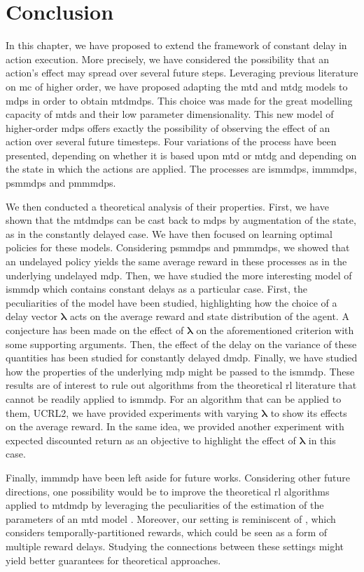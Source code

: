 \section{Conclusion}

In this chapter, we have proposed to extend the framework of constant delay in action execution.
More precisely, we have considered the possibility that an action's effect may spread over several future steps.
Leveraging previous literature on \gls{mc} of higher order, we have proposed adapting the \gls{mtd} and \gls{mtdg} models to \glspl{mdp} in order to obtain \glspl{mtdmdp}.
This choice was made for the great modelling capacity of \glspl{mtd} and their low parameter dimensionality. 
This new model of higher-order \glspl{mdp} offers exactly the possibility of observing the effect of an action over several future timesteps. 
Four variations of the process have been presented, depending on whether it is based upon \gls{mtd} or \gls{mtdg} and depending on the state in which the actions are applied. 
The processes are \glspl{ismmdp}, \glspl{immmdp}, \glspl{psmmdp} and \glspl{pmmmdp}.

We then conducted a theoretical analysis of their properties.
First, we have shown that the \glspl{mtdmdp} can be cast back to \glspl{mdp} by augmentation of the state, as in the constantly delayed case.
We have then focused on learning optimal policies for these models. 
Considering \glspl{psmmdp} and \glspl{pmmmdp}, we showed that an undelayed policy yields the same average reward in these processes as in the underlying undelayed \gls{mdp}.
Then, we have studied the more interesting model of \gls{ismmdp} which contains constant delays as a particular case.
First, the peculiarities of the model have been studied, highlighting how the choice of a delay vector $\boldsymbol\lambda$ acts on the average reward and state distribution of the agent.
A conjecture has been made on the effect of $\boldsymbol\lambda$ on the aforementioned criterion with some supporting arguments.
Then, the effect of the delay on the variance of these quantities has been studied for constantly delayed \gls{dmdp}. 
Finally, we have studied how the properties of the underlying \gls{mdp} might be passed to the \gls{ismmdp}.
These results are of interest to rule out algorithms from the theoretical \gls{rl} literature that cannot be readily applied to \gls{ismmdp}. 
For an algorithm that can be applied to them, UCRL2, we have provided experiments with varying $\boldsymbol\lambda$ to show its effects on the average reward.
In the same idea, we provided another experiment with expected discounted return as an objective to highlight the effect of $\boldsymbol\lambda$ in this case.

Finally, \gls{immmdp} have been left aside for future works.
Considering other future directions, one possibility would be to improve the theoretical \gls{rl} algorithms applied to \gls{mtdmdp} by leveraging the peculiarities of the estimation of the parameters of an \gls{mtd} model \cite{berchtold2002mixture}.
Moreover, our setting is reminiscent of \cite{romano2022multi}, which considers temporally-partitioned rewards, which could be seen as a form of multiple reward delays. 
Studying the connections between these settings might yield better guarantees for theoretical approaches.